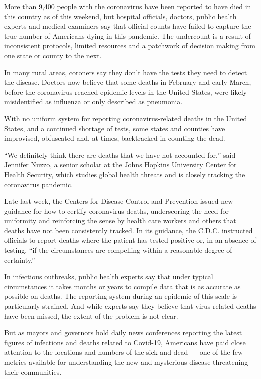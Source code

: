 More than 9,400 people with the coronavirus have been reported to have
died in this country as of this weekend, but hospital officials,
doctors, public health experts and medical examiners say that official
counts have failed to capture the true number of Americans dying in this
pandemic. The undercount is a result of inconsistent protocols, limited
resources and a patchwork of decision making from one state or county to
the next.

In many rural areas, coroners say they don't have the tests they need to
detect the disease. Doctors now believe that some deaths in February and
early March, before the coronavirus reached epidemic levels in the
United States, were likely misidentified as influenza or only described
as pneumonia.

With no uniform system for reporting coronavirus-related deaths in the
United States, and a continued shortage of tests, some states and
counties have improvised, obfuscated and, at times, backtracked in
counting the dead.

``We definitely think there are deaths that we have not accounted for,''
said Jennifer Nuzzo, a senior scholar at the Johns Hopkins University
Center for Health Security, which studies global health threats and is
\href{http://www.centerforhealthsecurity.org/}{closely tracking} the
coronavirus pandemic.

Late last week, the Centers for Disease Control and Prevention issued
new guidance for how to certify coronavirus deaths, underscoring the
need for uniformity and reinforcing the sense by health care workers and
others that deaths have not been consistently tracked. In its
\href{https://www.cdc.gov/nchs/data/nvss/vsrg/vsrg03-508.pdf}{guidance},
the C.D.C. instructed officials to report deaths where the patient has
tested positive or, in an absence of testing, ``if the circumstances are
compelling within a reasonable degree of certainty.''

In infectious outbreaks, public health experts say that under typical
circumstances it takes months or years to compile data that is as
accurate as possible on deaths. The reporting system during an epidemic
of this scale is particularly strained. And while experts say they
believe that virus-related deaths have been missed, the extent of the
problem is not clear.

But as mayors and governors hold daily news conferences reporting the
latest figures of infections and deaths related to Covid-19, Americans
have paid close attention to the locations and numbers of the sick and
dead --- one of the few metrics available for understanding the new and
mysterious disease threatening their communities.

